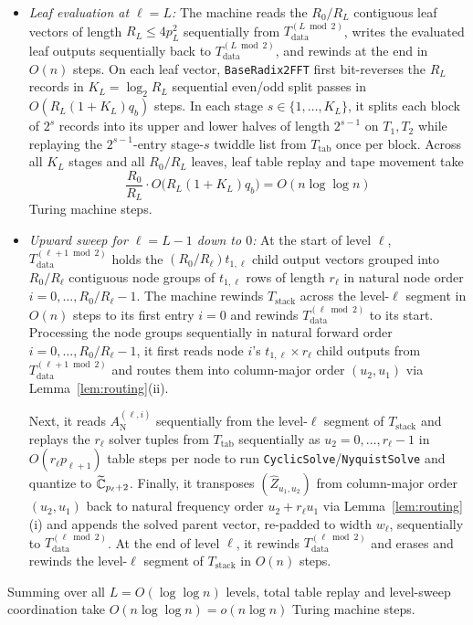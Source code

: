 \begin{itemize}[leftmargin=*]
  \item \emph{Leaf evaluation at $\ell = L$:} The machine reads the $R_0 / R_L$ contiguous leaf vectors of length $R_L \le 4 p_L^2$ sequentially from $T_{\mathrm{data}}^{(L \bmod 2)}$, writes the evaluated leaf outputs sequentially back to $T_{\mathrm{data}}^{(L \bmod 2)}$, and rewinds at the end in $O(n)$ steps. On each leaf vector, \texttt{BaseRadix2FFT} first bit-reverses the $R_L$ records in $K_L = \log_2 R_L$ sequential even/odd split passes in $O(R_L (1 + K_L) q_b)$ steps. In each stage $s \in \{1, \dots, K_L\}$, it splits each block of $2^s$ records into its upper and lower halves of length $2^{s-1}$ on $T_1, T_2$ while replaying the $2^{s-1}$-entry stage-$s$ twiddle list from $T_{\mathrm{tab}}$ once per block. Across all $K_L$ stages and all $R_0 / R_L$ leaves, leaf table replay and tape movement take
  \[
    \frac{R_0}{R_L} \cdot O\bigl(R_L (1 + K_L) q_b\bigr) = O(n \log \log n)
  \]
  Turing machine steps.

  \item \emph{Upward sweep for $\ell = L-1$ down to $0$:} At the start of level $\ell$, $T_{\mathrm{data}}^{(\ell+1 \bmod 2)}$ holds the $(R_0 / R_\ell) t_{1,\ell}$ child output vectors grouped into $R_0 / R_\ell$ contiguous node groups of $t_{1,\ell}$ rows of length $r_\ell$ in natural node order $i = 0, \dots, R_0 / R_\ell - 1$. The machine rewinds $T_{\mathrm{stack}}$ across the level-$\ell$ segment in $O(n)$ steps to its first entry $i = 0$ and rewinds $T_{\mathrm{data}}^{(\ell \bmod 2)}$ to its start. Processing the node groups sequentially in natural forward order $i = 0, \dots, R_0 / R_\ell - 1$, it first reads node $i$'s $t_{1,\ell} \times r_\ell$ child outputs from $T_{\mathrm{data}}^{(\ell+1 \bmod 2)}$ and routes them into column-major order $(u_2, u_1)$ via Lemma~\ref{lem:routing}(ii).

  Next, it reads $A_{\mathrm{N}}^{(\ell, i)}$ sequentially from the level-$\ell$ segment of $T_{\mathrm{stack}}$ and replays the $r_\ell$ solver tuples from $T_{\mathrm{tab}}$ sequentially as $u_2 = 0, \dots, r_\ell - 1$ in $O(r_\ell p_{\ell+1})$ table steps per node to run \texttt{CyclicSolve}/\texttt{NyquistSolve} and quantize to $\widetilde{\mathbb{C}}_{p_\ell+2}$. Finally, it transposes $(\widehat{Z}_{u_1, u_2})$ from column-major order $(u_2, u_1)$ back to natural frequency order $u_2 + r_\ell u_1$ via Lemma~\ref{lem:routing}(i) and appends the solved parent vector, re-padded to width $w_\ell$, sequentially to $T_{\mathrm{data}}^{(\ell \bmod 2)}$. At the end of level $\ell$, it rewinds $T_{\mathrm{data}}^{(\ell \bmod 2)}$ and erases and rewinds the level-$\ell$ segment of $T_{\mathrm{stack}}$ in $O(n)$ steps.
\end{itemize}
Summing over all $L = O(\log \log n)$ levels, total table replay and level-sweep coordination take $O(n \log \log n) = o(n \log n)$ Turing machine steps.
